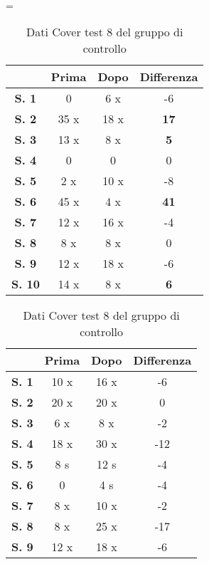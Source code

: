 \\\ \\\ \\\ \\\ \\\ \\\ \\\ 
\begin{table}[H]
\centering
\setlength\tabcolsep{4pt}
\begin{minipage}{0.48\textwidth}
\centering
\tablewidth=\textwidth

\begin{tabular}{|c|c|c|c|} \hline
{\textbf{}} & {\textbf{Prima}} & {\textbf{Dopo}}& {\textbf{Differenza}} \\ \hline
\textbf{S. 1} & 0 & 6 x & -6 \\ \hline
\textbf{S. 2} & 35 x & 18 x & \textbf{17} \\ \hline
\textbf{S. 3} & 13 x & 8 x & \textbf{5} \\ \hline
\textbf{S. 4} & 0 & 0 & 0 \\ \hline
\textbf{S. 5} & 2 x & 10 x & -8 \\ \hline
\textbf{S. 6} & 45 x & 4 x & \textbf{41} \\ \hline
\textbf{S. 7} & 12 x & 16 x & -4 \\ \hline
\textbf{S. 8} & 8 x & 8 x & 0 \\ \hline
\textbf{S. 9} & 12 x & 18 x & -6 \\ \hline
\textbf{S. 10} & 14 x & 8 x & \textbf{6} \\ \hline
\end{tabular} 
\caption{Dati Cover test 8 del gruppo sperimentale}

\label{tab:accuracy} 
\end{minipage}%
\hfill
\begin{minipage}{0.48\textwidth}
\centering

\begin{tabular}{|c|c|c|c|} \hline
{\textbf{}} & {\textbf{Prima}} & {\textbf{Dopo}}& {\textbf{Differenza}} \\ \hline
\textbf{S. 1} & 10 x & 16 x & -6 \\ \hline
\textbf{S. 2} & 20 x & 20 x & 0 \\ \hline
\textbf{S. 3} & 6 x & 8 x & -2 \\ \hline
\textbf{S. 4} & 18 x & 30 x & -12 \\ \hline
\textbf{S. 5} & 8 s & 12 s & -4 \\ \hline
\textbf{S. 6} & 0  & 4 s & -4 \\ \hline
\textbf{S. 7} & 8 x & 10 x & -2 \\ \hline
\textbf{S. 8} & 8 x & 25 x & -17 \\ \hline
\textbf{S. 9} & 12 x & 18 x & -6 \\ \hline
\end{tabular} 
\caption{Dati Cover test 8 del gruppo di controllo}

 \label{tab:ompdiff} 
\end{minipage}
\end{table}
